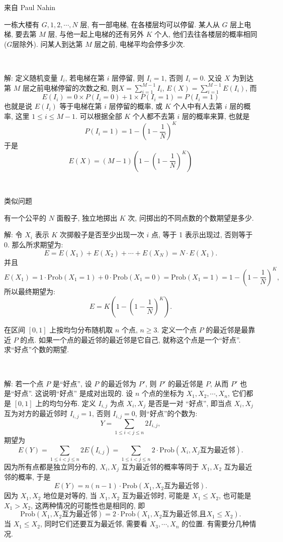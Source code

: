 \newpage

\noindent 来自 Paul Nahin

一栋大楼有 $G,1,2,\cdots,N$ 层, 有一部电梯, 在各楼层均可以停留. 某人从 $G$ 层上电梯, 要去第 $M$ 层, 与他一起上电梯的还有另外 $K$ 个人, 他们去往各楼层的概率相同 ($G$层除外). 问某人到达第 $M$ 层之前, 电梯平均会停多少次.

~

解: 定义随机变量 $I_i$, 若电梯在第 $i$ 层停留, 则 $I_i = 1$, 否则 $I_i = 0$. 又设 $X$ 为到达第 $M$ 层之前电梯停留的次数之和, 则$\displaystyle X = \sum_{i=1}^{M-1}I_i$, $\displaystyle E(X) = \sum_{i=1}^{M-1} E(I_i)$, 而
\[E(I_i) = 0\times P(I_i = 0) + 1\times P(I_i=1) = P(I_i=1)\]
也就是说 $E(I_i)$ 等于电梯在第 $i$ 层停留的概率, 或 $K$ 个人中有人去第 $i$ 层的概率, 这里 $1\le i\le M - 1$. 可以根据全部 $K$ 个人都不去第 $i$ 层的概率来算, 也就是
\[
P(I_i=1) = 1 - (1-\frac{1}{N})^K
\]
于是
\[
E(X) = (M-1)\left(1-(1-\frac{1}{N})^K\right)
\]

~

\noindent 类似问题

有一个公平的 $N$ 面骰子, 独立地掷出 $K$ 次, 问掷出的不同点数的个数期望是多少.

解: 令 $X_i$ 表示 $K$ 次掷骰子是否至少出现一次 $i$ 点, 等于 1 表示出现过, 否则等于 0. 那么所求期望为:
\[E = E(X_1)+E(X_2)+\cdots+E(X_N) = N\cdot E(X_1) .\]
并且
\[
E(X_1) = 1\cdot\mathrm{Prob}(X_1=1)+0\cdot\mathrm{Prob}(X_1=0) = \mathrm{Prob}(X_1=1) = 1-(1-\frac{1}{N})^K ,
\]
所以最终期望为:
\[E = K\left(1-(1-\frac{1}{N})^K \right) .\]


\newpage

在区间 $[0,1]$ 上按均匀分布随机取 $n$ 个点, $n \ge 3$. 定义一个点 $P$ 的最近邻是最靠近 $P$ 的点. 如果一个点的最近邻的最近邻是它自己, 就称这个点是一个``好点''. 求``好点''个数的期望.

~

解: 若一个点 $P$ 是``好点'', 设 $P$ 的最近邻为 $P'$, 则 $P'$ 的最近邻是 $P$, 从而 $P'$ 也是``好点''. 这说明``好点'' 是成对出现的. 设 $n$ 个点的坐标为 $X_1, X_2, \cdots, X_n$, 它们都是 $[0,1]$ 上的均匀分布. 定义 $I_{i,j}$ 为点 $X_i, X_j$ 是否是一对 ``好点'', 即当点 $X_i, X_j$ 互为对方的最近邻时 $I_{i,j} = 1$, 否则 $I_{i,j}=0$, 则``好点''的个数为:
\[ Y = \sum_{1\le i < j \le n}{2I_{i,j}}, \]
期望为
\[ E(Y) = \sum_{1\le i < j \le n}{2E(I_{i,j})} = \sum_{1\le i < j \le n}{2\cdot\mathrm{Prob}(X_i,X_j\text{互为最近邻})} .\]
因为所有点都是独立同分布的, $X_i,X_j$ 互为最近邻的概率等同于 $X_1, X_2$ 互为最近邻的概率, 于是
\[E(Y) = n(n-1)\cdot\mathrm{Prob}(X_1,X_2\text{互为最近邻}) .\]
因为 $X_1, X_2$ 地位是对等的, 当 $X_1,X_2$ 互为最近邻时, 可能是 $X_1 \le X_2$, 也可能是 $X_1 > X_2$, 这两种情况的可能性也是相同的, 即
\[\mathrm{Prob}(X_1,X_2\text{互为最近邻}) = 2\cdot\mathrm{Prob}(X_1,X_2\text{互为最近邻,且}X_1 \le X_2) .\]
当 $X_1 \le X_2$, 同时它们还要互为最近邻, 需要看 $X_3, \cdots, X_n$ 的位置. 有需要分几种情况.

